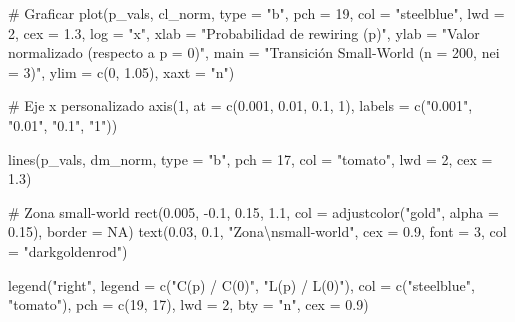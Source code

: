 \documentclass[
  letterpaper,
  DIV=11,
  numbers=noendperiod]{scrreprt}
\newenvironment{Shaded}{\begin{snugshade}}{\end{snugshade}}
\newcommand{\AttributeTok}[1]{\textcolor[rgb]{0.40,0.45,0.13}{#1}}
\newcommand{\CommentTok}[1]{\textcolor[rgb]{0.37,0.37,0.37}{#1}}
\newcommand{\ConstantTok}[1]{\textcolor[rgb]{0.56,0.35,0.01}{#1}}
\newcommand{\DecValTok}[1]{\textcolor[rgb]{0.68,0.00,0.00}{#1}}
\newcommand{\FloatTok}[1]{\textcolor[rgb]{0.68,0.00,0.00}{#1}}
\newcommand{\FunctionTok}[1]{\textcolor[rgb]{0.28,0.35,0.67}{#1}}
\newcommand{\NormalTok}[1]{\textcolor[rgb]{0.00,0.23,0.31}{#1}}
\newcommand{\SpecialCharTok}[1]{\textcolor[rgb]{0.37,0.37,0.37}{#1}}
\newcommand{\StringTok}[1]{\textcolor[rgb]{0.13,0.47,0.30}{#1}}
\begin{document}
\begin{Shaded}
\begin{Highlighting}[]
\CommentTok{\# Graficar}
\FunctionTok{plot}\NormalTok{(p\_vals, cl\_norm, }
     \AttributeTok{type =} \StringTok{"b"}\NormalTok{, }\AttributeTok{pch =} \DecValTok{19}\NormalTok{, }\AttributeTok{col =} \StringTok{"steelblue"}\NormalTok{, }\AttributeTok{lwd =} \DecValTok{2}\NormalTok{, }\AttributeTok{cex =} \FloatTok{1.3}\NormalTok{,}
     \AttributeTok{log =} \StringTok{"x"}\NormalTok{,}
     \AttributeTok{xlab =} \StringTok{"Probabilidad de rewiring (p)"}\NormalTok{,}
     \AttributeTok{ylab =} \StringTok{"Valor normalizado (respecto a p = 0)"}\NormalTok{,}
     \AttributeTok{main =} \StringTok{"Transición Small{-}World (n = 200, nei = 3)"}\NormalTok{,}
     \AttributeTok{ylim =} \FunctionTok{c}\NormalTok{(}\DecValTok{0}\NormalTok{, }\FloatTok{1.05}\NormalTok{),}
     \AttributeTok{xaxt =} \StringTok{"n"}\NormalTok{)}

\CommentTok{\# Eje x personalizado}
\FunctionTok{axis}\NormalTok{(}\DecValTok{1}\NormalTok{, }\AttributeTok{at =} \FunctionTok{c}\NormalTok{(}\FloatTok{0.001}\NormalTok{, }\FloatTok{0.01}\NormalTok{, }\FloatTok{0.1}\NormalTok{, }\DecValTok{1}\NormalTok{), }
     \AttributeTok{labels =} \FunctionTok{c}\NormalTok{(}\StringTok{"0.001"}\NormalTok{, }\StringTok{"0.01"}\NormalTok{, }\StringTok{"0.1"}\NormalTok{, }\StringTok{"1"}\NormalTok{))}

\FunctionTok{lines}\NormalTok{(p\_vals, dm\_norm, }
      \AttributeTok{type =} \StringTok{"b"}\NormalTok{, }\AttributeTok{pch =} \DecValTok{17}\NormalTok{, }\AttributeTok{col =} \StringTok{"tomato"}\NormalTok{, }\AttributeTok{lwd =} \DecValTok{2}\NormalTok{, }\AttributeTok{cex =} \FloatTok{1.3}\NormalTok{)}

\CommentTok{\# Zona small{-}world}
\FunctionTok{rect}\NormalTok{(}\FloatTok{0.005}\NormalTok{, }\SpecialCharTok{{-}}\FloatTok{0.1}\NormalTok{, }\FloatTok{0.15}\NormalTok{, }\FloatTok{1.1}\NormalTok{, }
     \AttributeTok{col =} \FunctionTok{adjustcolor}\NormalTok{(}\StringTok{"gold"}\NormalTok{, }\AttributeTok{alpha =} \FloatTok{0.15}\NormalTok{), }\AttributeTok{border =} \ConstantTok{NA}\NormalTok{)}
\FunctionTok{text}\NormalTok{(}\FloatTok{0.03}\NormalTok{, }\FloatTok{0.1}\NormalTok{, }\StringTok{"Zona}\SpecialCharTok{\textbackslash{}n}\StringTok{small{-}world"}\NormalTok{, }\AttributeTok{cex =} \FloatTok{0.9}\NormalTok{, }\AttributeTok{font =} \DecValTok{3}\NormalTok{, }\AttributeTok{col =} \StringTok{"darkgoldenrod"}\NormalTok{)}

\FunctionTok{legend}\NormalTok{(}\StringTok{"right"}\NormalTok{,}
       \AttributeTok{legend =} \FunctionTok{c}\NormalTok{(}\StringTok{"C(p) / C(0)"}\NormalTok{, }\StringTok{"L(p) / L(0)"}\NormalTok{),}
       \AttributeTok{col =} \FunctionTok{c}\NormalTok{(}\StringTok{"steelblue"}\NormalTok{, }\StringTok{"tomato"}\NormalTok{),}
       \AttributeTok{pch =} \FunctionTok{c}\NormalTok{(}\DecValTok{19}\NormalTok{, }\DecValTok{17}\NormalTok{), }\AttributeTok{lwd =} \DecValTok{2}\NormalTok{,}
       \AttributeTok{bty =} \StringTok{"n"}\NormalTok{, }\AttributeTok{cex =} \FloatTok{0.9}\NormalTok{)}
\end{Highlighting}
\end{Shaded}
\end{document}
